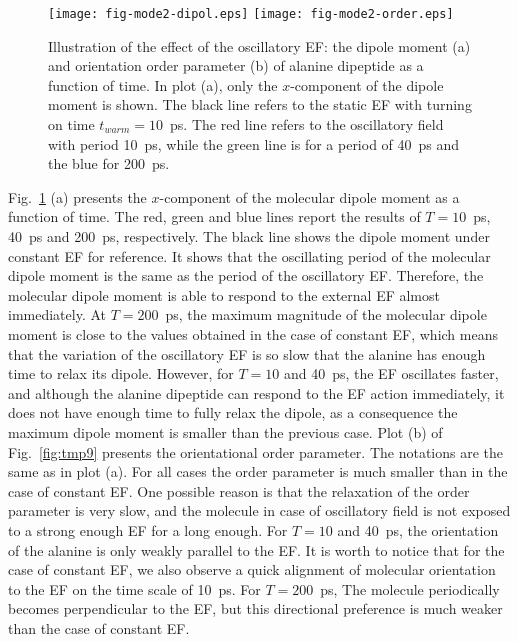 \documentclass[a4paper,preprint,unsortedaddress,onecolumn]{revtex4-1}
\begin{document}
\begin{figure}
  \centering
  \texttt{[image: fig-mode2-dipol.eps]}
  \texttt{[image: fig-mode2-order.eps]}
  \caption{Illustration of the effect of the oscillatory EF:
    the dipole moment (a) and
    orientation order parameter (b) of alanine dipeptide as a
    function of time. In plot (a),
    only the $x$-component of the dipole moment is
    shown. The black line refers to the static EF with turning on
    time $t_{warm} = 10$~ps. The red line refers to the oscillatory field with period
    10~ps, while the green line is for a period of 40~ps and the blue for 200~ps.}
  \label{fig:tmp8}
\end{figure}


Fig.~\ref{fig:tmp8} (a)
presents the $x$-component of the molecular dipole moment as
a function of time. The red, green and blue lines report the
results of $T=10$~ps, 40~ps and 200~ps, respectively. The black line
shows the dipole moment under constant EF
for reference.
It shows that the oscillating period of the molecular dipole moment
is the same as the period of the oscillatory EF. Therefore,
the molecular dipole moment
is able to respond to the external EF almost immediately.
At $T=200$~ps, the maximum magnitude of the molecular
dipole moment is close to the values obtained in the case of constant EF, which
means that the variation of the oscillatory EF is so slow that the
alanine has enough time to 
relax its dipole. However,
for $T=10$ and 40~ps, the EF oscillates faster,
and although the alanine dipeptide can respond to the EF action immediately,
it does not have enough time to fully relax the dipole, as a consequence the maximum dipole moment is smaller than the previous case.
Plot (b) of Fig.~\ref{fig:tmp9} presents the orientational order
parameter. The notations are the same as in plot (a).
For all cases the order parameter is much
smaller than in the case of constant EF. One possible reason is that the
relaxation of the order parameter is very slow, and the molecule in case of oscillatory field is
not exposed to a strong enough EF for a long enough. For  $T=10$ and 40~ps, the orientation of the alanine is only weakly
parallel to the EF. It is worth to notice that for the case of constant EF,
we also observe a quick alignment of molecular orientation to the EF
on the time scale of 10~ps. For $T=200$~ps, The molecule periodically
becomes perpendicular to the EF, but this directional preference is much
weaker than the case of constant EF.
\end{document}
